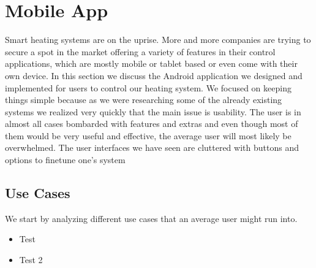 
\chapter{Mobile App}
\label{sec:mobile_app}

Smart heating systems are on the uprise. More and more companies are trying to secure a spot in the market offering a variety of features in their control applications, which are mostly mobile or tablet based or even come with their own device. In this section we discuss the Android application we designed and implemented for users to control our heating system. We focused on keeping things simple because as we were researching some of the already existing systems we realized very quickly that the main issue is usability. The user is in almost all cases bombarded with features and extras and even though most of them would be very useful and effective, the average user will most likely be overwhelmed. The user interfaces we have seen are cluttered with buttons and options to finetune one's system
\section{Use Cases}

We start by analyzing different use cases that an average user might run into.

\begin{itemize}
\item Test
\item Test 2
\end{itemize}
